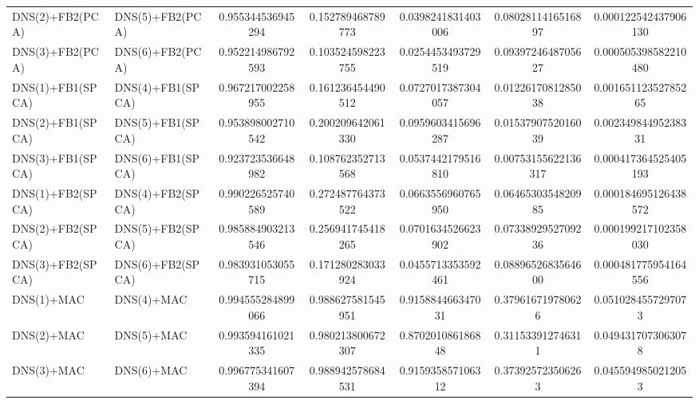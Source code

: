 \begin{table}[H]
\begin{tabular}{llSSSSS}
DNS(2)+FB2(PCA) & DNS(5)+FB2(PCA) & 0.955344536945294 & 0.152789468789773 & 0.0398241831403006 & 0.0802811416516897 & 0.000122542437906130 \\ 
DNS(3)+FB2(PCA) & DNS(6)+FB2(PCA) & 0.952214986792593 & 0.103524598223755 & 0.0254453493729519 & 0.0939724648705627 & 0.000505398582210480 \\ 
DNS(1)+FB1(SPCA) & DNS(4)+FB1(SPCA) & 0.967217002258955 & 0.161236454490512 & 0.0727017387304057 & 0.0122617081285038 & 0.00165112352785265 \\ 
DNS(2)+FB1(SPCA) & DNS(5)+FB1(SPCA) & 0.953898002710542 & 0.200209642061330 & 0.0959603415696287 & 0.0153790752016039 & 0.00234984495238331 \\ 
DNS(3)+FB1(SPCA) & DNS(6)+FB1(SPCA) & 0.923723536648982 & 0.108762352713568 & 0.0537442179516810 & 0.00753155622136317 & 0.000417364525405193 \\ 
DNS(1)+FB2(SPCA) & DNS(4)+FB2(SPCA) & 0.990226525740589 & 0.272487764373522 & 0.0663556960765950 & 0.0646530354820985 & 0.000184695126438572 \\ 
DNS(2)+FB2(SPCA) & DNS(5)+FB2(SPCA) & 0.985884903213546 & 0.256941745418265 & 0.0701634526623902 & 0.0733892952709236 & 0.000199217102358030 \\ 
DNS(3)+FB2(SPCA) & DNS(6)+FB2(SPCA) & 0.983931053055715 & 0.171280283033924 & 0.0455713353592461 & 0.0889652683564600 & 0.000481775954164556 \\ 
DNS(1)+MAC & DNS(4)+MAC & 0.994555284899066 & 0.988627581545951 & 0.915884466347031 & 0.379616719780626 & 0.0510284557297073 \\ 
DNS(2)+MAC & DNS(5)+MAC & 0.993594161021335 & 0.980213800672307 & 0.870201086186848 & 0.311533912746311 & 0.0494317073063078 \\ 
DNS(3)+MAC & DNS(6)+MAC & 0.996775341607394 & 0.988942578684531 & 0.915935857106312 & 0.373925723506263 & 0.0455949850212053 \\ \bottomrule 
\end{tabular}
\end{table}


